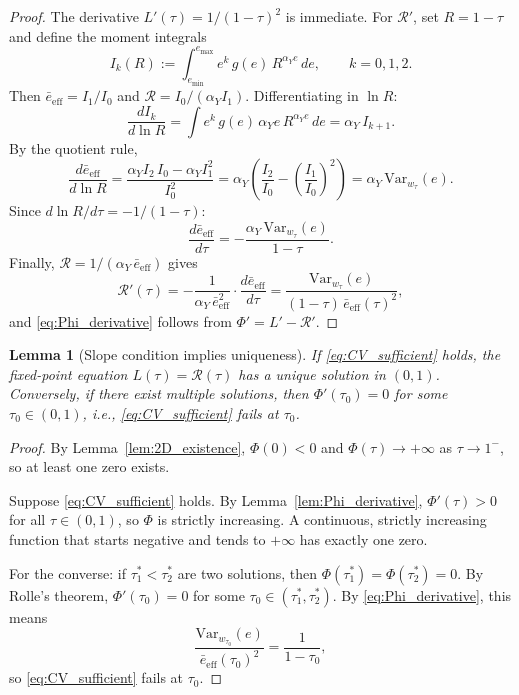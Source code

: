 \documentclass[12pt,a4paper]{article}
\theoremstyle{definition}
\theoremstyle{plain}
\newtheorem{lemma}{Lemma}[section]
\theoremstyle{remark}
\newcommand{\calR}{\mathcal{R}}
\begin{document}
\begin{proof}
The derivative $L'(\tau) = 1/(1-\tau)^2$ is immediate.
For $\calR'$, set $R = 1-\tau$ and define the moment integrals
\[
  I_k(R) := \int_{e_{\min}}^{e_{\max}} e^k\,g(e)\,R^{\alpha_Y e}\,de,
  \qquad k = 0,1,2.
\]
Then $\bar{e}_{\mathrm{eff}} = I_1/I_0$ and
$\calR = I_0/(\alpha_Y I_1)$.  Differentiating in $\ln R$:
\[
  \frac{dI_k}{d\ln R}
  = \int e^k\,g(e)\,\alpha_Y e\,R^{\alpha_Y e}\,de
  = \alpha_Y\,I_{k+1}.
\]
By the quotient rule,
\[
  \frac{d\bar{e}_{\mathrm{eff}}}{d\ln R}
  = \frac{\alpha_Y I_2\,I_0 - \alpha_Y I_1^2}{I_0^2}
  = \alpha_Y\!\left(\frac{I_2}{I_0}
    - \left(\frac{I_1}{I_0}\right)^{\!2}\right)
  = \alpha_Y\,\mathrm{Var}_{w_\tau}(e).
\]
Since $d\ln R/d\tau = -1/(1-\tau)$:
\[
  \frac{d\bar{e}_{\mathrm{eff}}}{d\tau}
  = -\frac{\alpha_Y\,\mathrm{Var}_{w_\tau}(e)}{1-\tau}.
\]
Finally, $\calR = 1/(\alpha_Y\,\bar{e}_{\mathrm{eff}})$ gives
\[
  \calR'(\tau)
  = -\frac{1}{\alpha_Y\,\bar{e}_{\mathrm{eff}}^2}
    \cdot \frac{d\bar{e}_{\mathrm{eff}}}{d\tau}
  = \frac{\mathrm{Var}_{w_\tau}(e)}
         {(1-\tau)\,\bar{e}_{\mathrm{eff}}(\tau)^2},
\]
and \eqref{eq:Phi_derivative} follows from
$\Phi' = L' - \calR'$.
\end{proof}


\begin{lemma}[Slope condition implies uniqueness]
\label{lem:slope_uniqueness}
If \eqref{eq:CV_sufficient} holds, the fixed-point equation
$L(\tau) = \calR(\tau)$ has a unique solution in $(0,1)$.
Conversely, if there exist multiple solutions, then
$\Phi'(\tau_0) = 0$ for some $\tau_0 \in (0,1)$, i.e.,
\eqref{eq:CV_sufficient} fails at $\tau_0$.
\end{lemma}

\begin{proof}
By Lemma~\ref{lem:2D_existence}, $\Phi(0) < 0$ and
$\Phi(\tau) \to +\infty$ as $\tau \to 1^-$, so at least one
zero exists.

Suppose \eqref{eq:CV_sufficient} holds.  By
Lemma~\ref{lem:Phi_derivative},
$\Phi'(\tau) > 0$ for all $\tau \in (0,1)$, so $\Phi$ is
strictly increasing.  A continuous, strictly increasing function
that starts negative and tends to $+\infty$ has exactly one
zero.

For the converse: if $\tau_1^* < \tau_2^*$ are two solutions,
then $\Phi(\tau_1^*) = \Phi(\tau_2^*) = 0$.  By Rolle's
theorem, $\Phi'(\tau_0) = 0$ for some
$\tau_0 \in (\tau_1^*, \tau_2^*)$.  By
\eqref{eq:Phi_derivative}, this means
\[
  \frac{\mathrm{Var}_{w_{\tau_0}}(e)}
       {\bar{e}_{\mathrm{eff}}(\tau_0)^2}
  = \frac{1}{1-\tau_0},
\]
so \eqref{eq:CV_sufficient} fails at $\tau_0$.
\end{proof}
\end{document}
